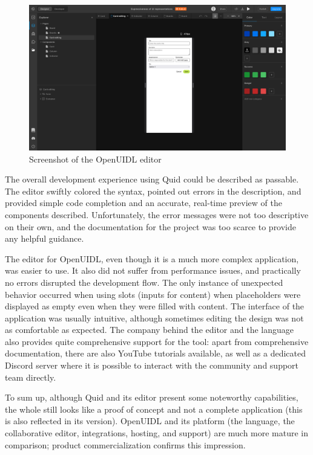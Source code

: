\begin{figure}[tbh]
    \centering
    \includegraphics[width=\textwidth]{4-results-and-discussion/openuidl-editor}
    \caption{Screenshot of the OpenUIDL editor}
    \label{fig:4-2-openuidl-editor}
\end{figure}

The overall development experience using Quid could be described as passable.
The editor swiftly colored the syntax, pointed out errors in the description, and provided simple code completion and an accurate, real-time preview of the components described.
Unfortunately, the error messages were not too descriptive on their own, and the documentation for the project was too scarce to provide any helpful guidance.

The editor for OpenUIDL, even though it is a much more complex application, was easier to use.
It also did not suffer from performance issues, and practically no errors disrupted the development flow.
The only instance of unexpected behavior occurred when using slots (inputs for content) when placeholders were displayed as empty even when they were filled with content.
The interface of the application was usually intuitive, although sometimes editing the design was not as comfortable as expected.
The company behind the editor and the language also provides quite comprehensive support for the tool: apart from comprehensive documentation, there are also YouTube tutorials available, as well as a dedicated Discord server where it is possible to interact with the community and support team directly.

To sum up, although Quid and its editor present some noteworthy capabilities, the whole still looks like a proof of concept and not a complete application (this is also reflected in its version).
OpenUIDL and its platform (the language, the collaborative editor, integrations, hosting, and support) are much more mature in comparison;
product commercialization confirms this impression.
